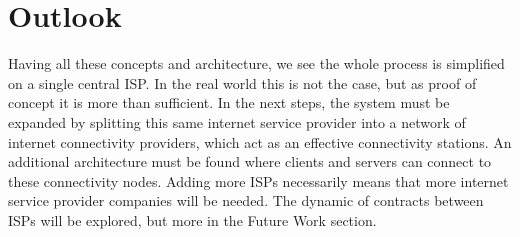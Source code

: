 \section{Outlook}
Having all these concepts and architecture, we see the whole process is simplified on a single central ISP. In the real world this is not the case, but as proof of concept it is more than sufficient. In the next steps, the system must be expanded by splitting this same internet service provider into a network of internet connectivity providers, which act as an effective connectivity stations. An additional architecture must be found where clients and servers can connect to these connectivity nodes. Adding more ISPs necessarily means that more internet service provider companies will be needed. The dynamic of contracts between ISPs will be explored, but more in the Future Work section.